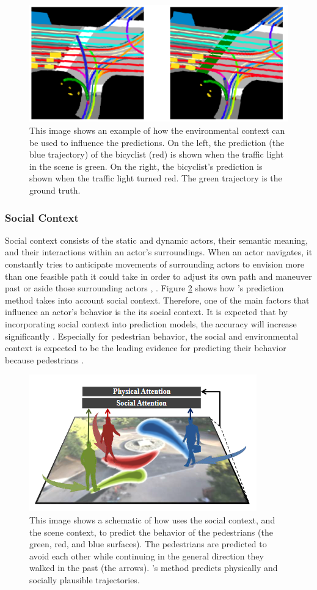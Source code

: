 \begin{figure}[h!]
	\centering
	\includegraphics[width=0.5\linewidth]{Figures/Introduction/Environmental_Context_TRaffic_Light_Chou}
	\caption{This image shows an example of how the environmental context can be used to influence the predictions. On the left, the prediction (the blue trajectory) of the bicyclist (red) is shown when the traffic light in the scene is green. On the right, the bicyclist's prediction is shown when the traffic light turned red. The green trajectory is the ground truth. \cite{chou2020predicting}}  
	\label{fig:env_cont}
\end{figure}


\subsubsection{Social Context}
Social context consists of the static and dynamic actors, their semantic meaning, and their interactions within an actor's surroundings. When an actor navigates, it constantly tries to anticipate movements of surrounding actors to envision more than one feasible path it could take in order to adjust its own path and maneuver past or aside those surrounding actors \cite{sadeghian2019sophie}, \cite{manh2018scene}. Figure \ref{fig:soc_cont} shows how \cite{sadeghian2019sophie}'s prediction method takes into account social context. Therefore, one of the main factors that influence an actor's behavior is the its social context. It is expected that by incorporating social context into prediction models, the accuracy will increase significantly \cite{pfeiffer2018data}. 
Especially for pedestrian behavior, the social and environmental context is expected to be the leading evidence for predicting their behavior because pedestrians  \cite{uah2020d4}. 

\begin{figure}[h!]
	\centering
	\includegraphics[width=0.4\linewidth]{Figures/Introduction/Social_context_Sadeghian}
	\caption{This image shows a schematic of how \cite{sadeghian2019sophie} uses the social context, and the scene context, to predict the behavior of the pedestrians (the green, red, and blue surfaces). The pedestrians are predicted to avoid each other while continuing in the general direction they walked in the past (the arrows). \cite{sadeghian2019sophie}'s method predicts physically and socially plausible trajectories.}  
	\label{fig:soc_cont}
\end{figure}

